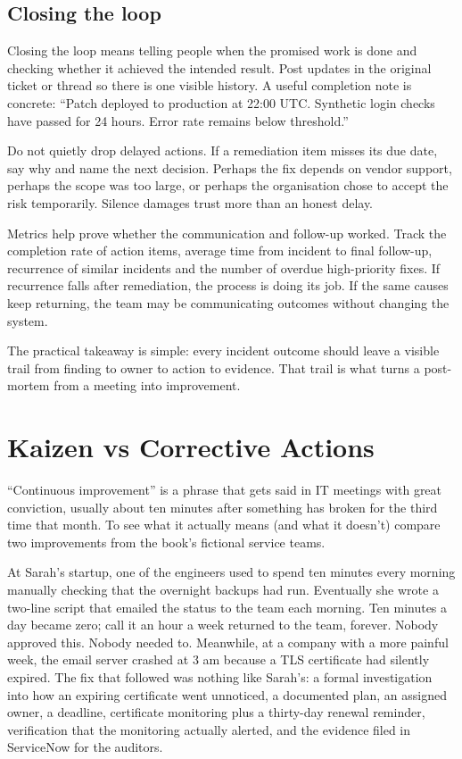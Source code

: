\subsection{Closing the loop}


Closing the loop means telling people when the promised work is done and checking whether it achieved the intended result. Post updates in the original ticket or thread so there is one visible history. A useful completion note is concrete: ``Patch deployed to production at 22:00 UTC. Synthetic login checks have passed for 24 hours. Error rate remains below threshold.''


Do not quietly drop delayed actions. If a remediation item misses its due date, say why and name the next decision. Perhaps the fix depends on vendor support, perhaps the scope was too large, or perhaps the organisation chose to accept the risk temporarily. Silence damages trust more than an honest delay.


Metrics help prove whether the communication and follow-up worked. Track the completion rate of action items, average time from incident to final follow-up, recurrence of similar incidents and the number of overdue high-priority fixes. If recurrence falls after remediation, the process is doing its job. If the same causes keep returning, the team may be communicating outcomes without changing the system.


The practical takeaway is simple: every incident outcome should leave a visible trail from finding to owner to action to evidence. That trail is what turns a post-mortem from a meeting into improvement.

\section{Kaizen vs Corrective Actions}
``Continuous improvement'' is a phrase that gets said in IT meetings with great conviction, usually about ten minutes after something has broken for the third time that month. To see what it actually means (and what it doesn't) compare two improvements from the book's fictional service teams.


At Sarah's startup, one of the engineers used to spend ten minutes every morning manually checking that the overnight backups had run. Eventually she wrote a two-line script that emailed the status to the team each morning. Ten minutes a day became zero; call it an hour a week returned to the team, forever. Nobody approved this. Nobody needed to. Meanwhile, at a company with a more painful week, the email server crashed at 3 am because a TLS certificate had silently expired. The fix that followed was nothing like Sarah's: a formal investigation into how an expiring certificate went unnoticed, a documented plan, an assigned owner, a deadline, certificate monitoring plus a thirty-day renewal reminder, verification that the monitoring actually alerted, and the evidence filed in ServiceNow for the auditors.


